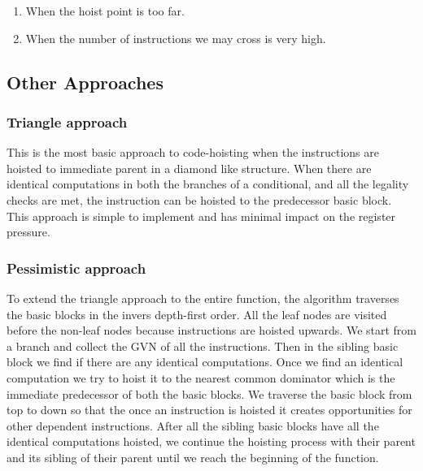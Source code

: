 \documentclass{sig-alternate}
\begin{document}
\begin{enumerate}
\item When the hoist point is too far.
\item When the number of instructions we may cross is very high.
\end{enumerate}


\subsection{Other Approaches}

\subsubsection{Triangle approach}
This is the most basic approach to code-hoisting when the instructions are
hoisted to immediate parent in a diamond like structure. When there are
identical computations in both the branches of a conditional, and all the
legality checks are met, the instruction can be hoisted to the predecessor basic
block. This approach is simple to implement and has minimal impact on the
register pressure.

\subsubsection{Pessimistic approach}
\label{subsec:pessimistic}
To extend the triangle approach to the entire function, the algorithm traverses
the basic blocks in the invers depth-first order. All the leaf nodes are visited
before the non-leaf nodes because instructions are hoisted upwards. We start
from a branch and collect the GVN of all the instructions. Then in the sibling
basic block we find if there are any identical computations. Once we find an
identical computation we try to hoist it to the nearest common dominator which
is the immediate predecessor of both the basic blocks. We traverse the basic
block from top to down so that the once an instruction is hoisted it creates
opportunities for other dependent instructions. After all the sibling basic
blocks have all the identical computations hoisted, we continue the hoisting
process with their parent and its sibling of their parent until we reach the
beginning of the function.
\end{document}
